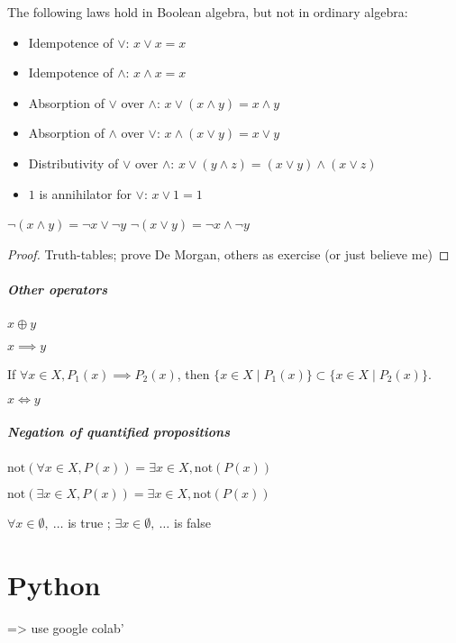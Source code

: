 \begin{property}
	The following laws hold in Boolean algebra, but not in ordinary algebra: 
	\begin{itemize}
		\item Idempotence of $\lor$: $x \lor x = x$
		\item Idempotence of $\land$: $x \land x = x$
		\item Absorption of $\lor$ over $\land$: $x \lor (x \land y)  = x \land y$
		\item Absorption of $\land$ over $\lor$: $x \land (x \lor y)  = x \lor y$
		\item Distributivity of $\lor$ over $\land$:  $x \lor (y \land z) = (x \lor y) \land (x \lor z)$
		\item $1$ is annihilator for $\lor$: $x \lor 1 = 1$
	\end{itemize}
\end{property}
\begin{property}
	$\lnot (x \land y) = \lnot x \lor \lnot y$
	$\lnot (x \lor y) = \lnot x \land \lnot y$
\end{property}
\begin{proof}
	Truth-tables; prove De Morgan, others as exercise (or just believe me)
\end{proof}

\subparagraph{Other operators}
\begin{definition}[Exclusive Or]
	$x \oplus y$
\end{definition}
\begin{definition}[Implication]
	$x \implies y$
\end{definition}
\begin{property}
	If $\forall x \in X, P_1(x) \implies P_2(x)$, then $\{ x \in X \mid P_1(x) \} \subset \{ x \in X \mid P_2(x) \}$.
\end{property}
\begin{definition}
	$x \iff y$
\end{definition}

\subparagraph{Negation of quantified propositions}
\begin{property}
	$\mathrm{not}(\forall x\in X, P(x)) = \exists x\in X, \mathrm{not}(P(x))$
\end{property}
\begin{property}
	$\mathrm{not}(\exists x\in X, P(x)) = \exists x\in X, \mathrm{not}(P(x))$
\end{property}
\begin{notation}
	$\forall x \in \emptyset, \ \dots$ is true ;
	$\exists x \in \emptyset, \ \dots$ is false
\end{notation}



\section{Python}
=> use google colab'



